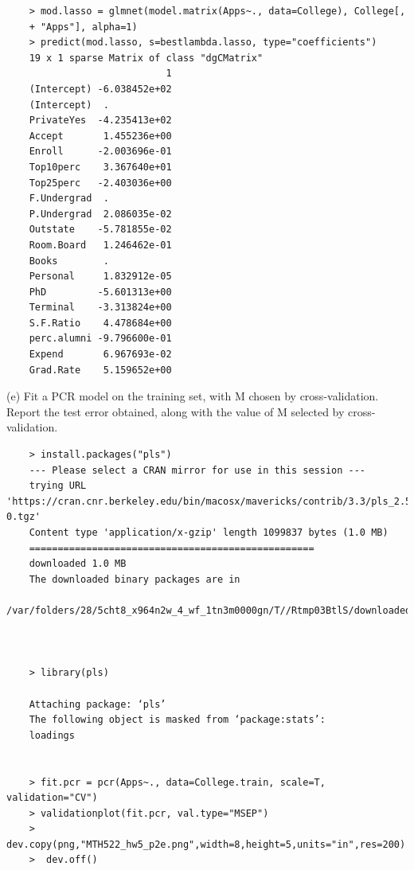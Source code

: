 \documentclass{article}
\begin{document}
\begin{program}
	\begin{verbatim}
	> mod.lasso = glmnet(model.matrix(Apps~., data=College), College[,
	+ "Apps"], alpha=1)
	> predict(mod.lasso, s=bestlambda.lasso, type="coefficients")
	19 x 1 sparse Matrix of class "dgCMatrix"
	                        1
	(Intercept) -6.038452e+02
	(Intercept)  .           
	PrivateYes  -4.235413e+02
	Accept       1.455236e+00
	Enroll      -2.003696e-01
	Top10perc    3.367640e+01
	Top25perc   -2.403036e+00
	F.Undergrad  .           
	P.Undergrad  2.086035e-02
	Outstate    -5.781855e-02
	Room.Board   1.246462e-01
	Books        .           
	Personal     1.832912e-05
	PhD         -5.601313e+00
	Terminal    -3.313824e+00
	S.F.Ratio    4.478684e+00
	perc.alumni -9.796600e-01
	Expend       6.967693e-02
	Grad.Rate    5.159652e+00	
	\end{verbatim}
\end{program}

\newpage


(e) Fit a PCR model on the training set, with M chosen by cross-validation. Report the test error obtained, along with the value of M selected by cross-validation.\\

\begin{program}
	\begin{verbatim}
	> install.packages("pls")
	--- Please select a CRAN mirror for use in this session ---
	trying URL 'https://cran.cnr.berkeley.edu/bin/macosx/mavericks/contrib/3.3/pls_2.5-0.tgz'
	Content type 'application/x-gzip' length 1099837 bytes (1.0 MB)
	==================================================
	downloaded 1.0 MB
	The downloaded binary packages are in
	/var/folders/28/5cht8_x964n2w_4_wf_1tn3m0000gn/T//Rtmp03BtlS/downloaded_packages
	
	

	> library(pls)
	
	Attaching package: ‘pls’
	The following object is masked from ‘package:stats’:
	loadings
	
	
	> fit.pcr = pcr(Apps~., data=College.train, scale=T, validation="CV")
	> validationplot(fit.pcr, val.type="MSEP")
	> dev.copy(png,"MTH522_hw5_p2e.png",width=8,height=5,units="in",res=200)
	>  dev.off()
	\end{verbatim}
\end{program}
\end{document}
